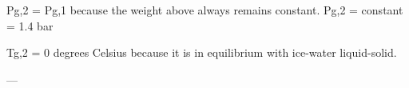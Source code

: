 Pg,2 = Pg,1 because the weight above always remains constant.  
Pg,2 = constant = 1.4 bar  

Tg,2 = 0 degrees Celsius because it is in equilibrium with ice-water liquid-solid.  

---